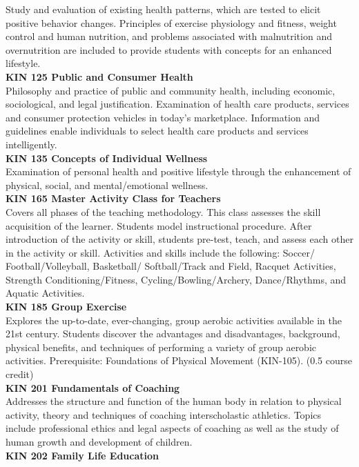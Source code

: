 \documentclass[
  letterpaper,
]{scrbook}
\begin{document}
Study and evaluation of existing health patterns, which are tested to
elicit positive behavior changes. Principles of exercise physiology and
fitness, weight control and human nutrition, and problems associated
with malnutrition and overnutrition are included to provide students
with concepts for an enhanced lifestyle.\\
\textbf{KIN 125 Public and Consumer Health}\\
Philosophy and practice of public and community health, including
economic, sociological, and legal justification. Examination of health
care products, services and consumer protection vehicles in today's
marketplace. Information and guidelines enable individuals to select
health care products and services intelligently.\\
\textbf{KIN 135 Concepts of Individual Wellness}\\
Examination of personal health and positive lifestyle through the
enhancement of physical, social, and mental/emotional wellness.\\
\textbf{KIN 165 Master Activity Class for Teachers}\\
Covers all phases of the teaching methodology. This class assesses the
skill acquisition of the learner. Students model instructional
procedure. After introduction of the activity or skill, students
pre-test, teach, and assess each other in the activity or skill.
Activities and skills include the following: Soccer/
Football/Volleyball, Basketball/ Softball/Track and Field, Racquet
Activities, Strength Conditioning/Fitness, Cycling/Bowling/Archery,
Dance/Rhythms, and Aquatic Activities.\\
\textbf{KIN 185 Group Exercise}\\
Explores the up-to-date, ever-changing, group aerobic activities
available in the 21st century. Students discover the advantages and
disadvantages, background, physical benefits, and techniques of
performing a variety of group aerobic activities. Prerequisite:
Foundations of Physical Movement (KIN-105). (0.5 course credit)\\
\textbf{KIN 201 Fundamentals of Coaching}\\
Addresses the structure and function of the human body in relation to
physical activity, theory and techniques of coaching interscholastic
athletics. Topics include professional ethics and legal aspects of
coaching as well as the study of human growth and development of
children.\\
\textbf{KIN 202 Family Life Education}\\
\end{document}
